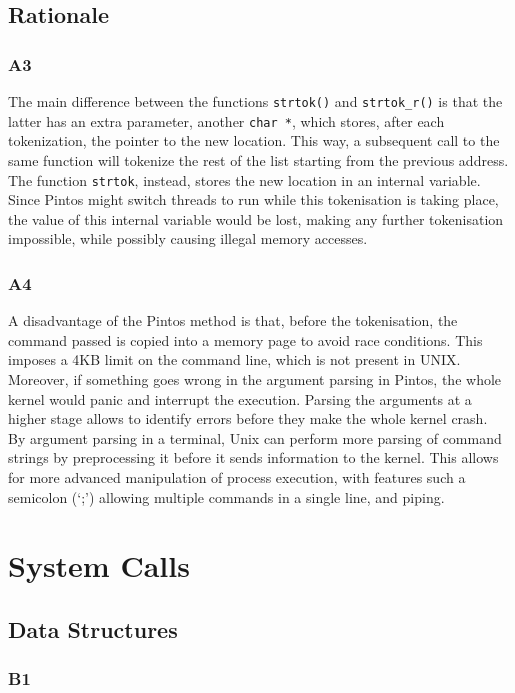 \documentclass[a4wide, 11pt]{article}
\newcommand{\tx}{\texttt}
\begin{document}
\subsection{Rationale}
\subsubsection{A3}
The main difference between the functions \tx{strtok()} and \tx{strtok\_r()} is that the latter has an extra parameter, another \tx{char *}, which stores, after each tokenization, the pointer to the new location. This way, a subsequent call to the same function will tokenize the rest of the list starting from the previous address. The function \tx{strtok}, instead, stores the new location in an internal variable. Since Pintos might switch threads to run while this tokenisation is taking place, the value of this internal variable would be lost, making any further tokenisation impossible, while possibly causing illegal memory accesses.
\subsubsection{A4}
A disadvantage of the Pintos method is that, before the tokenisation, the command passed is copied into a memory page to avoid race conditions. This imposes a 4KB limit on the command line, which is not present in UNIX. \\
Moreover, if something goes wrong  in the argument parsing in Pintos, the whole kernel would panic and interrupt the execution. Parsing the arguments at a higher stage allows to identify errors before they make the whole kernel crash.\\
By argument parsing in a terminal, Unix can perform more parsing of command strings by preprocessing it before it sends information to the kernel. This allows for more advanced manipulation of process execution, with features such a semicolon (`;') allowing multiple commands in a single line, and piping.

\section{System Calls}
\subsection{Data Structures}
\subsubsection{B1}
\end{document}
